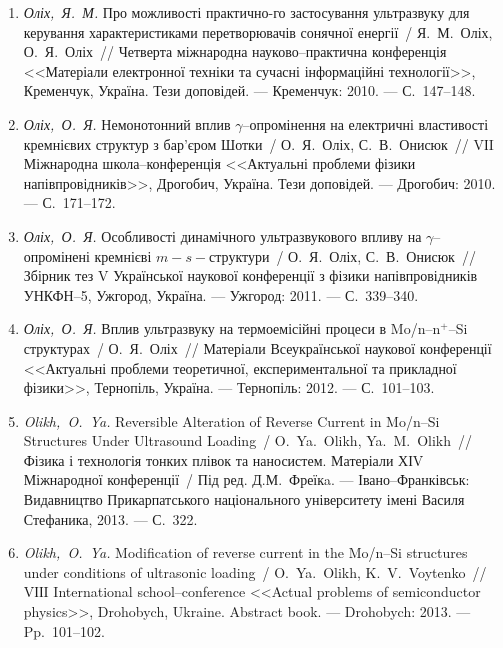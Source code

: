 \begin{enumerate}[label=\arabic*.,leftmargin=2em,itemindent=0cm]
\item
\emph{Оліх,~Я.~М.} Про можливості практично-го
  застосування ультразвуку для керування
  характеристиками перетворювачів
  сонячної енергії~/ Я.~М.~Оліх, О.~Я.~Оліх~//
  Четверта міжнародна науково--практична
  конференція <<Матеріали електронної
  техніки та сучасні інформаційні
  технології>>, {К}ременчук, {У}країна. Тези
  доповідей. ---
  {К}ременчук: 2010. ---
  {С.}~147--148.

\item
\emph{Оліх,~О.~Я.} Немонотонний вплив
  $\gamma$--опромінення на електричні
  властивості кремнієвих структур з
  бар’єром {Ш}отки~/ О.~Я.~Оліх, С.~В.~Онисюк~//
  {VІI} {М}іжнародна школа--конференція
  <<Актуальні проблеми фізики
  напівпровідників>>, {Д}рогобич, {У}країна.
  Тези доповідей. ---
  Дрогобич: 2010. ---
  {С.}~171--172.

\item
\emph{Оліх,~О.~Я.} Особливості динамічного
  ультразвукового впливу на
  $\gamma$--опромінені кремнієві $m-s-$структури~/
  О.~Я.~Оліх, С.~В.~Онисюк~// Збірник тез {V}
  {У}країнської наукової конференції з
  фізики напівпровідників {УНКФН}--5,
  Ужгород, {У}країна. ---
  Ужгород: 2011. ---
  {С.}~339--340.

\item
\emph{Оліх,~О.~Я.} Вплив ультразвуку на
  термоемісійні процеси в Mo/n--n$^+$--Si
  структурах~/ О.~Я.~Оліх~// Матеріали
  {В}сеукраїнської наукової конференції
  <<Актуальні проблеми теоретичної,
  експериментальної та прикладної фізики>>,
  {Т}ернопіль, {У}країна. ---
  Тернопіль: 2012. ---
  {С.}~101--103.

\item
\emph{Olikh,~O.~Ya.} Reversible Alteration of Reverse Current in Mo/n--Si
  Structures Under Ultrasound Loading~/ O.~Ya.~Olikh, Ya.~M.~Olikh~//
  Фізика і технологія тонких плівок та
  наносистем. {М}атеріали {ХІV} Міжнародної
  конференції~/ {Під ред. }Д.М.~Фреїкa. ---
  Івано--Франківськ: Видавництво
  {П}рикарпатського національного
  університету імені {В}асиля {С}тефаника,
  2013. ---
  {С.}~322.

\item
\emph{Olikh,~O.~Ya.} Modification of reverse current in the Mo/n--Si
  structures under conditions of ultrasonic loading~/ O.~Ya.~Olikh,
  K.~V.~Voytenko~// {VІІI} {I}nternational school--conference <<Actual
  problems of semiconductor physics>>, {D}rohobych, {U}kraine. Abstract book.
  ---
  Drohobych: 2013. ---
  Pp.~101--102.


\end{enumerate}
